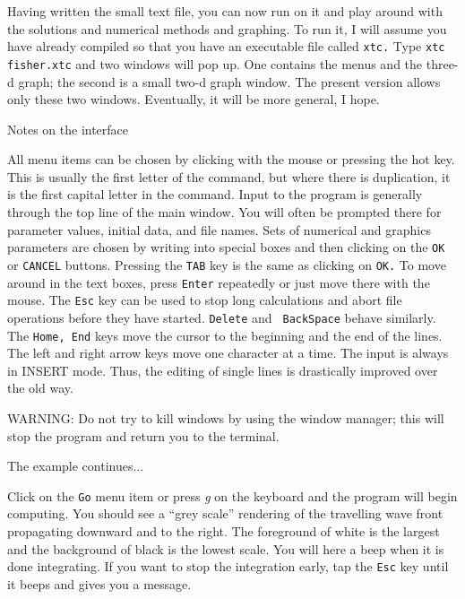 Having written the small text file, you can now run \xtc on it and
play around with the solutions and numerical methods and graphing. To
run it, I will assume you have already compiled \xtc so that you have
an executable file called {\tt xtc.}  Type {\tt xtc fisher.xtc} and
two windows will pop up.  One contains the menus and the three-d
graph; the second is a small two-d graph window.  The present version
allows only these two windows. Eventually, it will be more general, I
hope.  
\begin{center}
Notes on the interface
\end{center}
All menu items can be chosen by clicking with the mouse or pressing
the hot key.  This is usually the first letter of the command, but
where there is duplication, it is the first capital letter in the
command.  Input to the program is generally through the top line of
the main window.  You will often be prompted there for parameter
values, initial data, and file names.  Sets of numerical and graphics
parameters are chosen by writing into special boxes and then clicking
on the {\tt OK} or {\tt CANCEL} buttons.  Pressing the {\tt TAB} key
is the same as  clicking on {\tt OK.}  To move around in the text
boxes, press {\tt Enter} repeatedly or just move there with the
mouse.  The {\tt Esc} key can be used to stop long calculations and
abort file operations before they have started.  {\tt Delete} and {\tt
BackSpace} behave similarly.  The {\tt Home, End} keys move the cursor
to the beginning and the end of the lines. The left and right arrow
keys move one character at a time.  The input is always in INSERT
mode. Thus, the editing of single lines is drastically improved over
the old way.


WARNING: Do not try to kill windows by using the window manager; this
will stop the program and return you to the terminal. 
\begin{center}
    The example continues...
\end{center}
Click on the {\tt Go} menu item or press {\it g} on the
keyboard and the program will begin computing.  You should see a
``grey scale'' rendering of the travelling wave front propagating
downward and to the right. The foreground of white is the largest and
the background of black is the lowest scale.  You will here
a beep when it is done integrating.  If you want to stop the integration 
early, tap the {\tt Esc}  key until it beeps and gives you a message.
 


